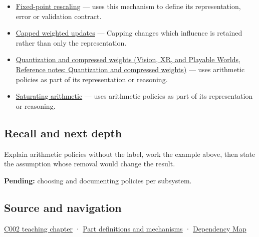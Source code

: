 \begin{itemize}
\item
  \hyperref[appendix-3333db47830f]{Fixed-point rescaling} --- uses this mechanism to define its representation, error or validation contract.
\item
  \hyperref[appendix-1e45d0613db3]{Capped weighted updates} --- Capping changes which influence is retained rather than only the representation.
\item
  \href{../07-Vision-XR-and-Playable-Worlds/main.pdf\#nameddest=appendix-fdc7879e8bf2}{Quantization and compressed weights (Vision, XR, and Playable Worlds, Reference notes: Quantization and compressed weights)} --- uses arithmetic policies as part of its representation or reasoning.
\item
  \hyperref[appendix-3999c6209649]{Saturating arithmetic} --- uses arithmetic policies as part of its representation or reasoning.
\end{itemize}

\subsection{Recall and next depth}\label{appendix-2ed044358b82-recall-and-next-depth}

Explain arithmetic policies without the label, work the example above, then state the assumption whose removal would change the result.

\textbf{Pending:} choosing and documenting policies per subsystem.

\subsection{Source and navigation}\label{appendix-2ed044358b82-source-and-navigation}

\hyperref[01-foundations-i-ch001-arithmetic-becomes-a-policy]{C002 teaching chapter} · \hyperref[appendix-fd090d982a15]{Part definitions and mechanisms} · \hyperref[appendix-4ad47bdd269a]{Dependency Map}
